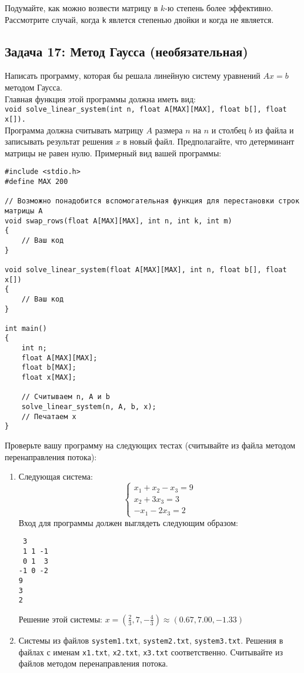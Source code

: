 \documentclass{article}
\begin{document}
Подумайте, как можно возвести матрицу в $k$-ю степень более эффективно. Рассмотрите случай, когда \texttt{k} явлется степенью двойки и когда не является.


\newpage
\subsection*{Задача 17: Метод Гаусса (необязательная)}
Написать программу, которая бы решала линейную систему уравнений $Ax = b$ методом Гаусса. \\
Главная функция этой программы должна иметь вид: \\ \texttt{void solve\_linear\_system(int n, float A[MAX][MAX], float b[], float x[]).} \\
Программа должна считывать матрицу $A$ размера $n$ на $n$ и столбец $b$ из файла и записывать результат решения $x$ в новый файл. Предполагайте, что детерминант матрицы не равен нулю. Примерный вид вашей программы:
\begin{lstlisting}
#include <stdio.h>
#define MAX 200

// Возможно понадобится вспомогательная функция для перестановки строк матрицы A
void swap_rows(float A[MAX][MAX], int n, int k, int m)
{
    // Ваш код
}

void solve_linear_system(float A[MAX][MAX], int n, float b[], float x[])
{
    // Ваш код
}

int main()
{
    int n;
    float A[MAX][MAX];
    float b[MAX];
    float x[MAX];
    
    // Считываем n, A и b
    solve_linear_system(n, A, b, x);
    // Печатаем x
}
\end{lstlisting}
Проверьте вашу программу на следующих тестах (считывайте из файла методом перенаправления потока): \\
\begin{enumerate}
\item Следующая система:
$$
\begin{cases} 
x_1 + x_2 - x_3 = 9 \\ 
x_2 + 3x_3 = 3 \\ 
-x_1 - 2x_3 = 2 
\end{cases}
$$
Вход для программы должен выглядеть следующим образом:
\begin{lstlisting}
 3
 1 1 -1
 0 1  3
-1 0 -2
9
3
2
\end{lstlisting}
Решение этой системы: $x = \left(\frac{2}{3}, 7, -\frac{4}{3}\right) \approx (0.67, 7.00, -1.33)$
\item Системы из файлов \texttt{system1.txt}, \texttt{system2.txt}, \texttt{system3.txt}. Решения в файлах с именам \texttt{x1.txt}, \texttt{x2.txt}, \texttt{x3.txt} соответственно. Считывайте из файлов методом перенаправления потока.
\end{enumerate}
\end{document}
